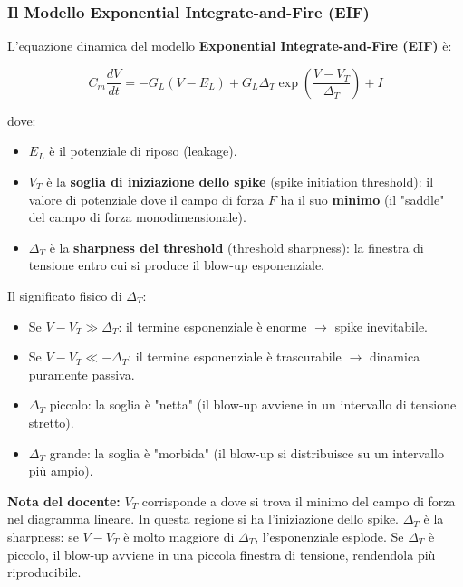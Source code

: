 \subsubsection{Il Modello Exponential Integrate-and-Fire (EIF)}

L'equazione dinamica del modello \textbf{Exponential Integrate-and-Fire (EIF)} è:

\begin{equation}
C_m \frac{dV}{dt} = -G_L(V - E_L) + G_L \Delta_T \exp\!\left(\frac{V - V_T}{\Delta_T}\right) + I
\end{equation}

dove:
\begin{itemize}
    \item $E_L$ è il potenziale di riposo (leakage).
    \item $V_T$ è la \textbf{soglia di iniziazione dello spike} (spike initiation threshold): il valore di potenziale dove il campo di forza $F$ ha il suo \textbf{minimo} (il "saddle" del campo di forza monodimensionale).
    \item $\Delta_T$ è la \textbf{sharpness del threshold} (threshold sharpness): la finestra di tensione entro cui si produce il blow-up esponenziale.
\end{itemize}

Il significato fisico di $\Delta_T$:
\begin{itemize}
    \item Se $V - V_T \gg \Delta_T$: il termine esponenziale è enorme $\rightarrow$ spike inevitabile.
    \item Se $V - V_T \ll -\Delta_T$: il termine esponenziale è trascurabile $\rightarrow$ dinamica puramente passiva.
    \item $\Delta_T$ piccolo: la soglia è "netta" (il blow-up avviene in un intervallo di tensione stretto).
    \item $\Delta_T$ grande: la soglia è "morbida" (il blow-up si distribuisce su un intervallo più ampio).
\end{itemize}

\begin{tcolorbox}[colback=gray!5, colframe=gray!40, arc=2mm, boxrule=0.5pt]
\textbf{Nota del docente:} $V_T$ corrisponde a dove si trova il minimo del campo di forza nel diagramma lineare. In questa regione si ha l'iniziazione dello spike. $\Delta_T$ è la sharpness: se $V - V_T$ è molto maggiore di $\Delta_T$, l'esponenziale esplode. Se $\Delta_T$ è piccolo, il blow-up avviene in una piccola finestra di tensione, rendendola più riproducibile.
\end{tcolorbox}


